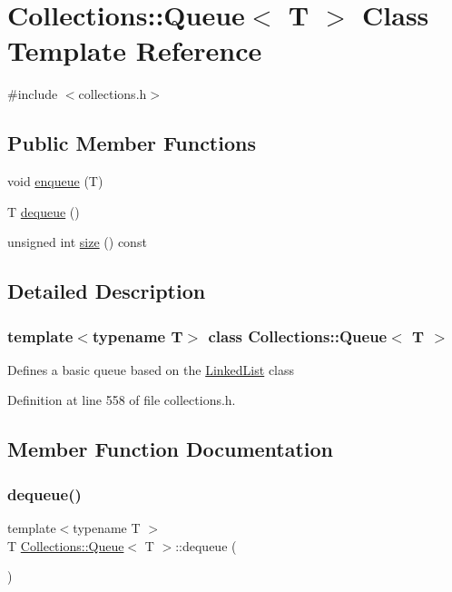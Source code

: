 \hypertarget{class_collections_1_1_queue}{}\section{Collections\+:\+:Queue$<$ T $>$ Class Template Reference}
\label{class_collections_1_1_queue}


{\ttfamily \#include $<$collections.\+h$>$}

\subsection*{Public Member Functions}
\begin{DoxyCompactItemize}
\item 
void \hyperlink{class_collections_1_1_queue_adf0213798edce1d9f823991cd0cd7657}{enqueue} (T)
\item 
T \hyperlink{class_collections_1_1_queue_a8a307196a29c03c9b3cd268601a41973}{dequeue} ()
\item 
unsigned int \hyperlink{class_collections_1_1_queue_a6fc286064fd7c5b6905a352f525f040b}{size} () const
\end{DoxyCompactItemize}


\subsection{Detailed Description}
\subsubsection*{template$<$typename T$>$\newline
class Collections\+::\+Queue$<$ T $>$}

Defines a basic queue based on the \hyperlink{class_collections_1_1_linked_list}{Linked\+List} class 

Definition at line 558 of file collections.\+h.



\subsection{Member Function Documentation}
\hypertarget{class_collections_1_1_queue_a8a307196a29c03c9b3cd268601a41973}{}\label{class_collections_1_1_queue_a8a307196a29c03c9b3cd268601a41973} 
\subsubsection{\texorpdfstring{dequeue()}{dequeue()}}
{\footnotesize\ttfamily template$<$typename T $>$ \\
T \hyperlink{class_collections_1_1_queue}{Collections\+::\+Queue}$<$ T $>$\+::dequeue (\begin{DoxyParamCaption}{ }\end{DoxyParamCaption})}

